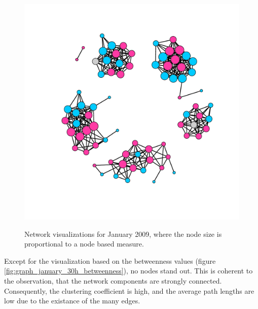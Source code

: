\begin{figure}[htpb]
{					\includegraphics[width=.45\textwidth]{assets/pdf/graph_january_30h_degree.pdf}
				}
	\qquad 
		
	\caption[Network visualizations where the node size is proportional to node based measures]{Network visualizations for January 2009, where the node size is proportional to a node based measure.} 
	 
\end{figure}

Except for the visualization based on the betweenness values (figure \ref{fig:graph_january_30h_betweenness}), no nodes stand out. This is coherent to the observation, that the network components are strongly connected. Consequently, the clustering coefficient is high, and the average path lengths are low due to the existance of the many edges.  

